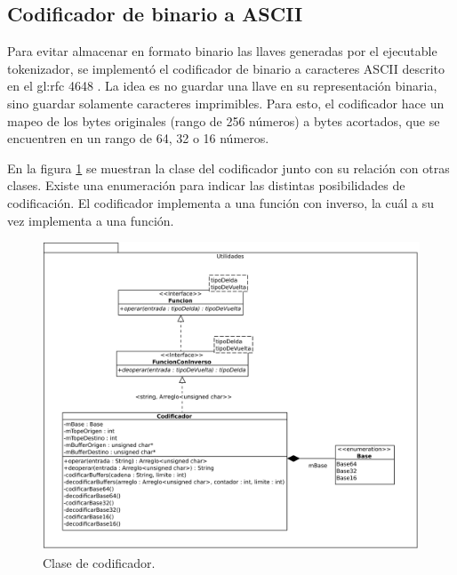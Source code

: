 %
%
%

\subsection{Codificador de binario a ASCII}

Para evitar almacenar en formato binario las llaves generadas por el ejecutable
tokenizador, se implementó el codificador de binario a caracteres ASCII descrito
en el \gls{gl:rfc} 4648 \cite{DBLP:journals/rfc/rfc4648}. La idea es no guardar
una llave en su representación binaria, sino guardar solamente caracteres
imprimibles. Para esto, el codificador hace un mapeo de los bytes originales
(rango de 256 números) a bytes acortados, que se encuentren en un rango de 64,
32 o 16 números.

En la figura \ref{clases_codificador} se muestran la clase del codificador junto
con su relación con otras clases. Existe una enumeración para indicar las
distintas posibilidades de codificación. El codificador implementa a una función
con inverso, la cuál a su vez implementa a una función.

\begin{figure}
  \begin{center}
    \includegraphics[width=0.7\linewidth]{diagramas/codificador.png}
    \caption{Clase de codificador.}
    \label{clases_codificador}
  \end{center}
\end{figure}
